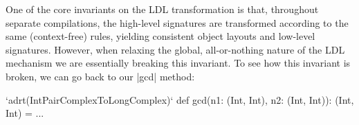 



One of the core invariants on the LDL transformation is that, throughout separate compilations, the high-level signatures are transformed according to the same (context-free) rules, yielding consistent object layouts and low-level signatures. However, when relaxing the global, all-or-nothing nature of the LDL mechanism we are essentially breaking this invariant.
%
%
%
%
%
%
To see how this invariant is broken, we can go back to our |gcd| method:

\begin{lstlisting-nobreak}
`adrt(IntPairComplexToLongComplex)` {
  def gcd(n1: (Int, Int), n2: (Int, Int)): (Int, Int) = ...
}
\end{lstlisting-nobreak}

